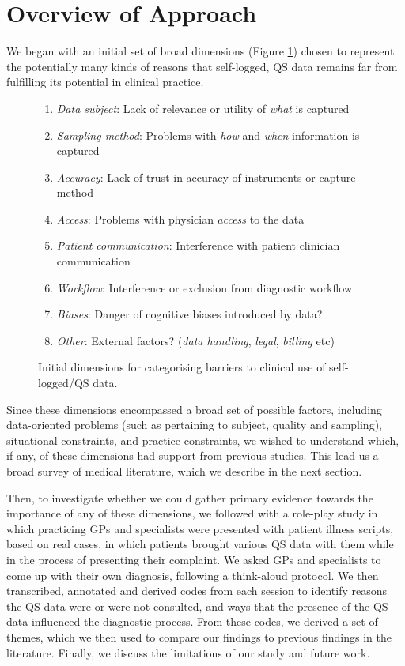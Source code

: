 \documentclass{sigchi}
\begin{document}
\section{Overview of Approach}

We began with an initial set of broad dimensions (Figure \ref{fig:qs}) chosen to represent the potentially many kinds of reasons that self-logged, QS data remains far from fulfilling its potential in clinical practice.

\begin{figure}[tbpb]
\begin{enumerate}
    \item \emph{Data subject}: Lack of relevance or utility of \emph{what} is captured
    \item \emph{Sampling method}: Problems with \emph{how} and \emph{when} information is captured
    \item \emph{Accuracy}: Lack of trust in accuracy of instruments or capture method
    \item \emph{Access}: Problems with physician \emph{access} to the data
    \item \emph{Patient communication}: Interference with patient clinician communication
    \item \emph{Workflow}: Interference or exclusion from diagnostic workflow
    \item \emph{Biases}: Danger of cognitive biases introduced by data?
    \item \emph{Other}: External factors? (\emph{data handling}, \emph{legal}, \emph{billing} etc)
\end{enumerate}
\caption{Initial dimensions for categorising barriers to clinical use of self-logged/QS data.}
\label{fig:qs}
\end{figure}

Since these dimensions encompassed a broad set of possible factors, including data-oriented problems (such as pertaining to subject, quality and sampling), situational constraints, and practice constraints, we wished to understand which, if any, of these dimensions had support from previous studies.  This lead us a broad survey of medical literature, which we describe in the next section.  

Then, to investigate whether we could gather primary evidence towards the importance of any of these dimensions, we followed with a role-play study in which practicing GPs and specialists were presented with patient illness scripts, based on real cases, in which patients brought various QS data with them while in the process of presenting their complaint.  We asked GPs and specialists to come up with their own diagnosis, following a think-aloud protocol.  We then transcribed, annotated and derived codes from each session to identify reasons the QS data were or were not consulted, and ways that the presence of the QS data influenced the diagnostic process.  From these codes, we derived a set of themes, which we then used to compare our findings to previous findings in the literature.  Finally, we discuss the limitations of our study and future work.
\end{document}
